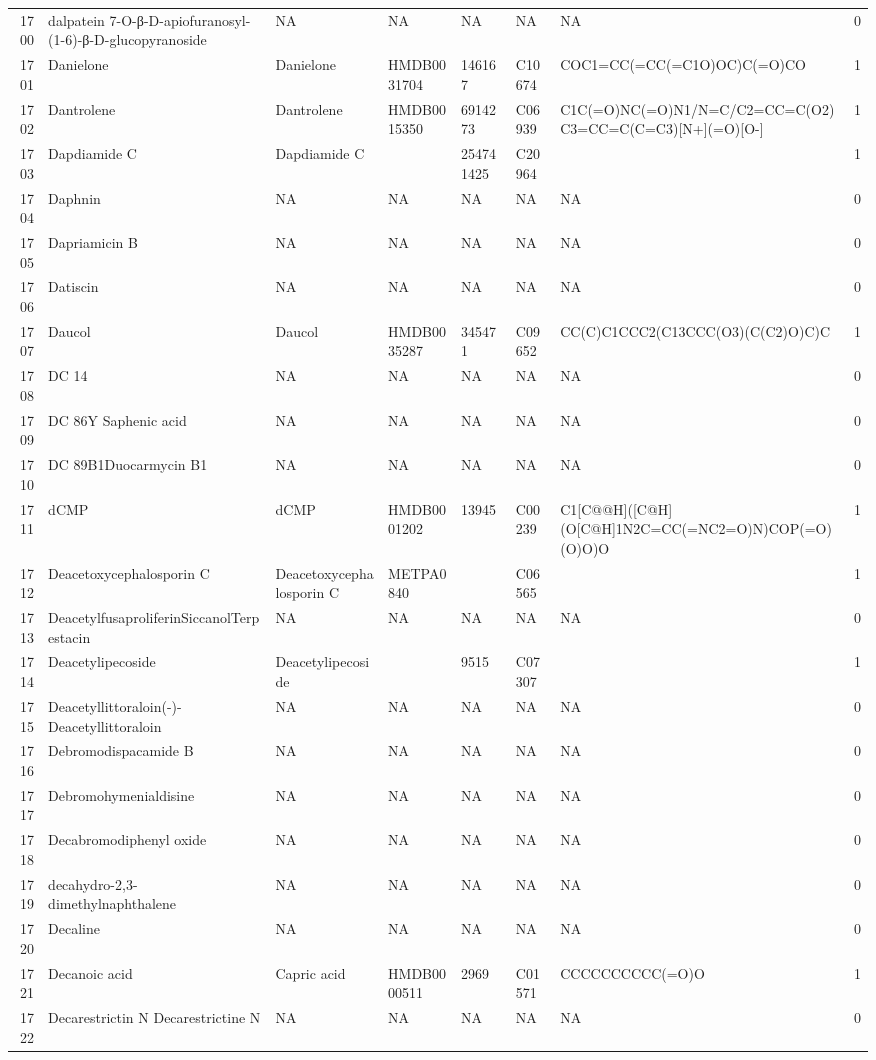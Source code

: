\documentclass[a4paper]{article}
\begin{document}
\begin{longtable}{rlllllll}
  1700 & dalpatein 7-O-β-D-apiofuranosyl-(1-6)-β-D-glucopyranoside & NA & NA & NA & NA & NA & 0 \\ 
  1701 & Danielone & Danielone & HMDB0031704 & 146167 & C10674 & COC1=CC(=CC(=C1O)OC)C(=O)CO & 1 \\ 
  1702 & Dantrolene & Dantrolene & HMDB0015350 & 6914273 & C06939 & C1C(=O)NC(=O)N1/N=C/C2=CC=C(O2)C3=CC=C(C=C3)[N+](=O)[O-] & 1 \\ 
  1703 & Dapdiamide C & Dapdiamide C &  & 254741425 & C20964 &  & 1 \\ 
  1704 & Daphnin & NA & NA & NA & NA & NA & 0 \\ 
  1705 & Dapriamicin B & NA & NA & NA & NA & NA & 0 \\ 
  1706 & Datiscin & NA & NA & NA & NA & NA & 0 \\ 
  1707 & Daucol & Daucol & HMDB0035287 & 345471 & C09652 & CC(C)C1CCC2(C13CCC(O3)(C(C2)O)C)C & 1 \\ 
  1708 & DC 14 & NA & NA & NA & NA & NA & 0 \\ 
  1709 & DC 86Y Saphenic acid & NA & NA & NA & NA & NA & 0 \\ 
  1710 & DC 89B1Duocarmycin B1 & NA & NA & NA & NA & NA & 0 \\ 
  1711 & dCMP & dCMP & HMDB0001202 & 13945 & C00239 & C1[C@@H]([C@H](O[C@H]1N2C=CC(=NC2=O)N)COP(=O)(O)O)O & 1 \\ 
  1712 & Deacetoxycephalosporin C & Deacetoxycephalosporin C & METPA0840 &  & C06565 &  & 1 \\ 
  1713 & DeacetylfusaproliferinSiccanolTerpestacin & NA & NA & NA & NA & NA & 0 \\ 
  1714 & Deacetylipecoside & Deacetylipecoside &  & 9515 & C07307 &  & 1 \\ 
  1715 & Deacetyllittoraloin(-)-Deacetyllittoraloin & NA & NA & NA & NA & NA & 0 \\ 
  1716 & Debromodispacamide B & NA & NA & NA & NA & NA & 0 \\ 
  1717 & Debromohymenialdisine & NA & NA & NA & NA & NA & 0 \\ 
  1718 & Decabromodiphenyl oxide & NA & NA & NA & NA & NA & 0 \\ 
  1719 & decahydro-2,3-dimethylnaphthalene & NA & NA & NA & NA & NA & 0 \\ 
  1720 & Decaline & NA & NA & NA & NA & NA & 0 \\ 
  1721 & Decanoic acid & Capric acid & HMDB0000511 & 2969 & C01571 & CCCCCCCCCC(=O)O & 1 \\ 
  1722 & Decarestrictin N Decarestrictine N & NA & NA & NA & NA & NA & 0 \\ 

\end{longtable}
\end{document}
